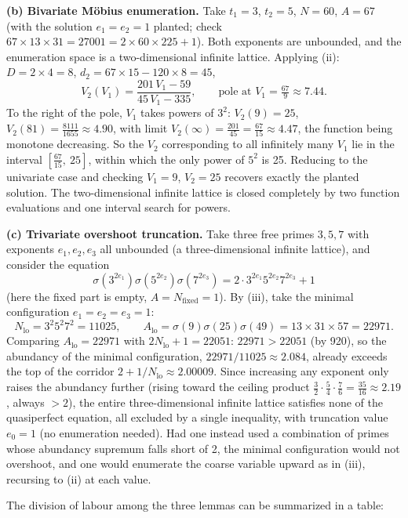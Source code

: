 \documentclass[11pt]{article}
\theoremstyle{remark}
\begin{document}
\textbf{(b) Bivariate M\"obius enumeration.} Take $t_1 = 3$, $t_2 = 5$, $N = 60$, $A = 67$ (with the solution $e_1 = e_2 = 1$ planted; check $67 \times 13 \times 31 = 27001 = 2 \times 60 \times 225 + 1$). Both exponents are unbounded, and the enumeration space is a two-dimensional infinite lattice. Applying (ii): $D = 2 \times 4 = 8$, $d_2 = 67 \times 15 - 120 \times 8 = 45$,
\[ V_2(V_1) = \frac{201\,V_1 - 59}{45\,V_1 - 335}, \qquad \text{pole at } V_1 = \tfrac{67}{9} \approx 7.44.
\] To the right of the pole, $V_1$ takes powers of $3^2$: $V_2(9) = 25$, $V_2(81) = \tfrac{8111}{1655} \approx 4.90$, with limit $V_2(\infty) = \tfrac{201}{45} = \tfrac{67}{15} \approx 4.47$, the function being monotone decreasing. So the $V_2$ corresponding to all infinitely many $V_1$ lie in the interval $[\tfrac{67}{15},\ 25]$, within which the only power of $5^2$ is 25. Reducing to the univariate case and checking $V_1 = 9$, $V_2 = 25$ recovers exactly the planted solution. The two-dimensional infinite lattice is closed completely by two function evaluations and one interval search for powers.

\textbf{(c) Trivariate overshoot truncation.} Take three free primes $3, 5, 7$ with exponents $e_1, e_2, e_3$ all unbounded (a three-dimensional infinite lattice), and consider the equation
\[ \sigma(3^{2e_1})\sigma(5^{2e_2})\sigma(7^{2e_3}) = 2\cdot 3^{2e_1}5^{2e_2}7^{2e_3} + 1
\] (here the fixed part is empty, $A = N_{\text{fixed}} = 1$). By (iii), take the minimal configuration $e_1 = e_2 = e_3 = 1$:
\[ N_{\mathrm{lo}} = 3^2 5^2 7^2 = 11025, \qquad A_{\mathrm{lo}} = \sigma(9)\sigma(25)\sigma(49) = 13 \times 31 \times 57 = 22971.
\] Comparing $A_{\mathrm{lo}} = 22971$ with $2N_{\mathrm{lo}} + 1 = 22051$: $22971 > 22051$ (by 920), so the abundancy of the minimal configuration, $22971/11025 \approx 2.084$, already exceeds the top of the corridor $2 + 1/N_{\mathrm{lo}} \approx 2.00009$. Since increasing any exponent only raises the abundancy further (rising toward the ceiling product $\tfrac32\cdot\tfrac54\cdot\tfrac76 = \tfrac{35}{16} \approx 2.19$, always $> 2$), the entire three-dimensional infinite lattice satisfies none of the quasiperfect equation, all excluded by a single inequality, with truncation value $e_0 = 1$ (no enumeration needed). Had one instead used a combination of primes whose abundancy supremum falls short of 2, the minimal configuration would not overshoot, and one would enumerate the coarse variable upward as in (iii), recursing to (ii) at each value.

The division of labour among the three lemmas can be summarized in a table:
\end{document}
